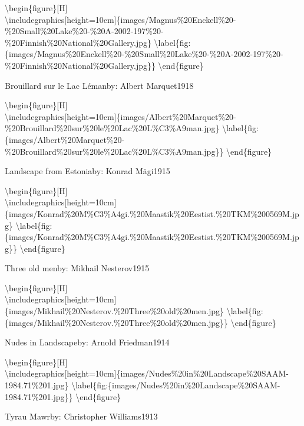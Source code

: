 \documentclass[
  a4paper,
]{book}
\begin{document}
\textbackslash begin\{figure\}{[}H{]}\\
\textbackslash includegraphics{[}height=10cm{]}\{images/Magnus\%20Enckell\%20-\%20Small\%20Lake\%20-\%20A-2002-197\%20-\%20Finnish\%20National\%20Gallery.jpg\}
\textbackslash label\{fig:\{images/Magnus\%20Enckell\%20-\%20Small\%20Lake\%20-\%20A-2002-197\%20-\%20Finnish\%20National\%20Gallery.jpg\}\}
\textbackslash end\{figure\}

\label{http:ux2fux2fwww.wikidata.orgux2fentityux2fQ26940419}
Brouillard sur le Lac Lémanby: Albert Marquet1918

\textbackslash begin\{figure\}{[}H{]}\\
\textbackslash includegraphics{[}height=10cm{]}\{images/Albert\%20Marquet\%20-\%20Brouillard\%20sur\%20le\%20Lac\%20L\%C3\%A9man.jpg\}
\textbackslash label\{fig:\{images/Albert\%20Marquet\%20-\%20Brouillard\%20sur\%20le\%20Lac\%20L\%C3\%A9man.jpg\}\}
\textbackslash end\{figure\}

\label{http:ux2fux2fwww.wikidata.orgux2fentityux2fQ50353962}
Landscape from Estoniaby: Konrad Mägi1915

\textbackslash begin\{figure\}{[}H{]}\\
\textbackslash includegraphics{[}height=10cm{]}\{images/Konrad\%20M\%C3\%A4gi.\%20Maastik\%20Eestist.\%20TKM\%200569M.jpg\}
\textbackslash label\{fig:\{images/Konrad\%20M\%C3\%A4gi.\%20Maastik\%20Eestist.\%20TKM\%200569M.jpg\}\}
\textbackslash end\{figure\}

\label{http:ux2fux2fwww.wikidata.orgux2fentityux2fQ105078801}
Three old menby: Mikhail Nesterov1915

\textbackslash begin\{figure\}{[}H{]}\\
\textbackslash includegraphics{[}height=10cm{]}\{images/Mikhail\%20Nesterov.\%20Three\%20old\%20men.jpg\}
\textbackslash label\{fig:\{images/Mikhail\%20Nesterov.\%20Three\%20old\%20men.jpg\}\}
\textbackslash end\{figure\}

\label{http:ux2fux2fwww.wikidata.orgux2fentityux2fQ20488491}
Nudes in Landscapeby: Arnold Friedman1914

\textbackslash begin\{figure\}{[}H{]}\\
\textbackslash includegraphics{[}height=10cm{]}\{images/Nudes\%20in\%20Landscape\%20SAAM-1984.71\%201.jpg\}
\textbackslash label\{fig:\{images/Nudes\%20in\%20Landscape\%20SAAM-1984.71\%201.jpg\}\}
\textbackslash end\{figure\}

\label{http:ux2fux2fwww.wikidata.orgux2fentityux2fQ76998117}
Tyrau Mawrby: Christopher Williams1913
\end{document}
